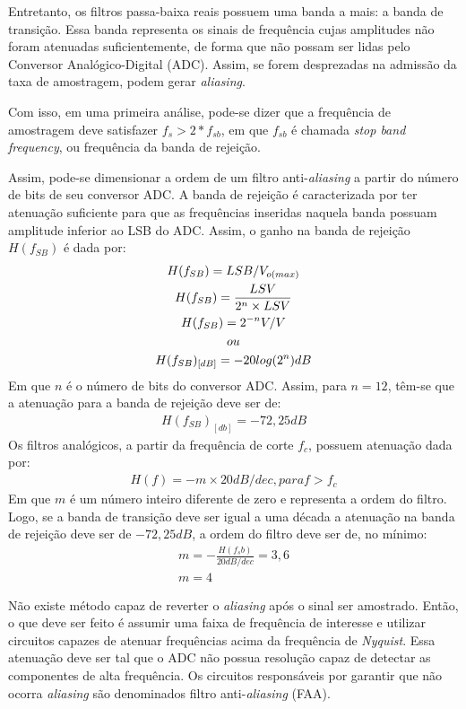 \documentclass[
	12pt,				%
	openright,			%
	twoside,			%
	a4paper,			%
	english,			%
	french,				%
	spanish,			%
	brazil,				%
	]{abntex2}
\begin{document}
		Entretanto, os filtros passa-baixa reais possuem uma banda a
		mais: a banda de transição. Essa banda representa os sinais de
		frequência cujas amplitudes não foram atenuadas suficientemente,
		de forma que não possam ser lidas pelo Conversor Analógico-Digital
		(ADC). Assim, se forem desprezadas na admissão da taxa de amostragem,
		podem gerar \textit{aliasing}.

		Com isso, em uma primeira análise, pode-se dizer que a frequência de
		amostragem deve satisfazer $f_s>2*f_{sb}$, em que $f_{sb}$ é chamada
		\textit{stop band frequency}, ou frequência da banda de rejeição.

		Assim, pode-se dimensionar a ordem de um filtro anti-\textit{aliasing} a partir do número de bits de seu conversor ADC. A banda de rejeição é caracterizada por ter atenuação
		suficiente para que as frequências inseridas naquela banda possuam amplitude
		inferior ao LSB do ADC. Assim, o ganho na banda de rejeição $H(f_{SB})$ é
		dada por:
		\begin{gather*}
			H(f_{SB}) = LSB/V_{o(max)}\\
			H(f_{SB}) = \frac{LSV}{2^n\times LSV}\\
			H(f_{SB}) = 2^{-n}V/V\\
			ou\\
			H(f_{SB})_{[dB]} = -20\*log(2^n) dB
		\end{gather*}
		Em que $n$ é o número de bits do conversor ADC. Assim, para $n=12$, têm-se que a atenuação para a banda de rejeição deve ser de:
		\begin{gather*}
			H(f_{SB})_{[db]} = -72,25 dB
		\end{gather*}
		Os filtros analógicos, a partir da frequência de corte $f_c$, possuem atenuação dada por:
		\begin{gather*}
			H(f) = -m\times 20 dB/dec, para f>f_c
		\end{gather*}
		Em que $m$ é um número inteiro diferente de zero e representa a ordem do filtro. Logo, se a banda de transição deve ser igual a uma década a atenuação na banda de rejeição deve ser de $-72,25 dB$, a ordem do filtro deve ser de, no mínimo:
		\begin{gather*}
			m = -\frac{H(f_sb)}{20 dB/dec} = 3,6\\
			m = 4
		\end{gather*}

		Não existe método capaz de reverter o \textit{aliasing} após o
		sinal ser amostrado. Então, o que deve ser feito é assumir uma
		faixa de frequência de interesse e utilizar circuitos capazes de
		atenuar frequências acima da frequência de \textit{Nyquist}.
		Essa atenuação deve ser tal que o ADC não possua resolução capaz
		de detectar as componentes de alta frequência. Os circuitos
		responsáveis por garantir que não ocorra \textit{aliasing} são
		denominados filtro anti-\textit{aliasing} (FAA).
\end{document}
